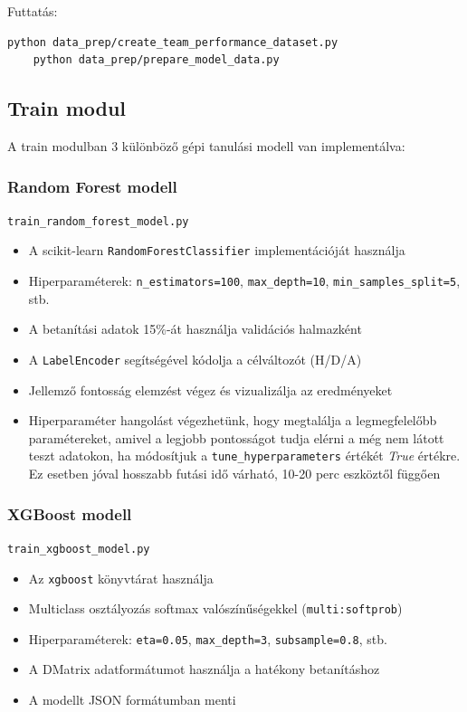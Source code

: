 Futtatás:
\begin{lstlisting}[language=bash]
    python data_prep/create_team_performance_dataset.py
    python data_prep/prepare_model_data.py
\end{lstlisting}


\subsection{Train modul}

A train modulban 3 különböző gépi tanulási modell van implementálva:

\subsubsection{Random Forest modell}

\texttt{train\_random\_forest\_model.py}

\begin{itemize}
    \item A scikit-learn \texttt{RandomForestClassifier} implementációját használja
    \item Hiperparaméterek: \texttt{n\_estimators=100}, \texttt{max\_depth=10}, \texttt{min\_samples\_split=5}, stb.
    \item A betanítási adatok 15\%-át használja validációs halmazként
    \item A \texttt{LabelEncoder} segítségével kódolja a célváltozót (H/D/A)
    \item Jellemző fontosság elemzést végez és vizualizálja az eredményeket
    \item Hiperparaméter hangolást végezhetünk, hogy megtalálja a legmegfelelőbb paramétereket, amivel a legjobb pontosságot tudja elérni a még nem látott teszt adatokon, ha módosítjuk a \texttt{tune\_hyperparameters} értékét \textit{True} értékre. Ez esetben jóval hosszabb futási idő várható, 10-20 perc eszköztől függően
\end{itemize}

\subsubsection{XGBoost modell}

\texttt{train\_xgboost\_model.py}

\begin{itemize}
    \item Az \texttt{xgboost} könyvtárat használja
    \item Multiclass osztályozás softmax valószínűségekkel (\texttt{multi:softprob})
    \item Hiperparaméterek: \texttt{eta=0.05}, \texttt{max\_depth=3}, \texttt{subsample=0.8}, stb.
    \item A DMatrix adatformátumot használja a hatékony betanításhoz
    \item A modellt JSON formátumban menti
\end{itemize}

